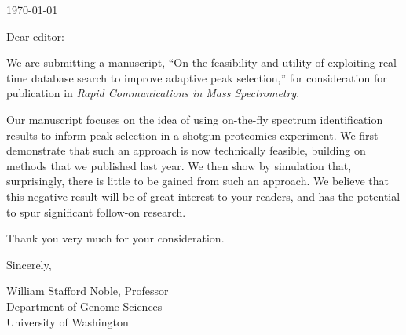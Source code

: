 \documentclass[12pt]{article}
\begin{document}
\hspace*{3.0in}\today

\vspace*{3ex}

\noindent
Dear editor:

\vspace*{1ex}

We are submitting a manuscript, ``On the feasibility and utility of
exploiting real time database search to improve adaptive peak
selection,'' for consideration for publication in {\em Rapid
  Communications in Mass Spectrometry}.

Our manuscript focuses on the idea of using on-the-fly spectrum
identification results to inform peak selection in a shotgun
proteomics experiment.  We first demonstrate that such an approach is
now technically feasible, building on methods that we published last
year.  We then show by simulation that, surprisingly,
there is little to be gained from such an approach.  We believe that
this negative result will be of great interest to your readers, and
has the potential to spur significant follow-on research.

Thank you very much for your consideration.

\vspace*{1ex}

\noindent
Sincerely,

\hspace*{1ex}

\noindent
William Stafford Noble, Professor\\
Department of Genome Sciences\\
University of Washington
\end{document}
